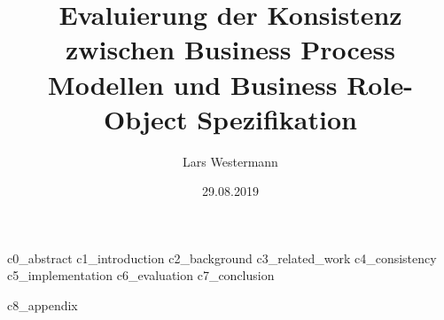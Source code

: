 \documentclass[ngerman]{tudscrreprt}
\begin{document}
\date{29.08.2019}
\author{Lars Westermann}
\title{Evaluierung der Konsistenz zwischen Business Process Modellen und Business Role-Object Spezifikation}
\supervisor{}
\maketitle

\tableofcontents

{c0_abstract}
{c1_introduction}
{c2_background}
{c3_related_work}
{c4_consistency}
{c5_implementation}
{c6_evaluation}
{c7_conclusion}

\printbibliography

{c8_appendix}
\end{document}
